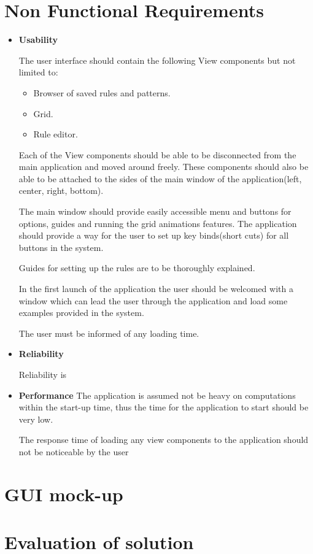 \documentclass{article}
\begin{document}
\section{Non Functional Requirements}
\begin{itemize}
	\item \Large { \bf Usability} 

	The user interface should contain the following View components but not limited to:
	\begin{itemize}
		\item Browser of saved rules and patterns.
		\item Grid.
		\item Rule editor.
	\end{itemize}
	Each of the View components should be able to be disconnected from the main application
	and moved around freely. These components should also be able to be attached to the sides
	of the main window of the application(left, center, right, bottom).
	
	The main window should provide easily accessible menu and buttons for options, guides
	and running the grid animations features. The application should provide a way for the user
	to set up key binds(short cuts) for all buttons in the system.
	
	Guides for setting up the rules are to be thoroughly explained.
	
	In the first launch of the application the user should be welcomed with a window
	which can lead the user through the application and load some examples provided in the 
	system.
	
	The user must be informed of any loading time.

	\item \Large {\bf Reliability }
	
	Reliability is
	
	\item \Large {\bf Performance }
	The application is assumed not be heavy on computations within the start-up time,
	thus the time for the application to start should be very low.
	
	The response time of loading any view components to the application should not be noticeable by the user
	
	
\end{itemize} 

\section{GUI mock-up}

\section{Evaluation of solution}
\end{document}
